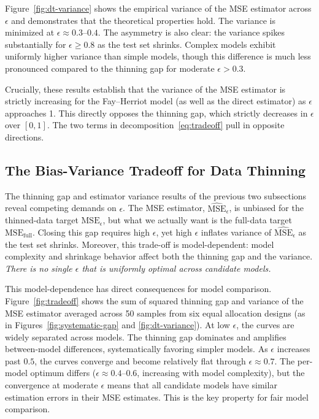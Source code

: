 \documentclass[11pt]{article}
\newcommand{\msehat}{\widehat{\mathrm{MSE}}_{\epsilon}}
\newcommand{\msethin}{\mathrm{MSE}_{\epsilon}}
\newcommand{\msefull}{\mathrm{MSE}_{\mathrm{full}}}
\theoremstyle{plain}
\theoremstyle{definition}
\theoremstyle{remark}
\begin{document}
Figure~\ref{fig:dt-variance} shows the empirical variance of the MSE estimator across $\epsilon$ and demonstrates that the theoretical properties hold. The variance is minimized at $\epsilon \approx 0.3$--$0.4$. The asymmetry is also clear: the variance spikes substantially for $\epsilon \geq 0.8$ as the test set shrinks. Complex models exhibit uniformly higher variance than simple models, though this difference is much less pronounced compared to the thinning gap for moderate $\epsilon>0.3$.

Crucially, these results establish that the variance of the MSE estimator is strictly increasing for the Fay--Herriot model (as well as the direct estimator) as $\epsilon$ approaches 1. This directly opposes the thinning gap, which strictly decreases in $\epsilon$ over $[0, 1]$.  The two terms in decomposition~\eqref{eq:tradeoff} pull in opposite directions.




\subsection{The Bias-Variance Tradeoff for Data Thinning}\label{sec:fundamental_tension}

The thinning gap and estimator variance results of the previous two subsections reveal competing demands on $\epsilon$. The MSE estimator, $\msehat$, is unbiased for the thinned-data target $\msethin$, but what we actually want is the full-data target $\msefull$. Closing this gap requires high $\epsilon$, yet high $\epsilon$ inflates variance of $\msehat$ as the test set shrinks. Moreover, this trade-off is model-dependent: model complexity and shrinkage behavior affect both the thinning gap and the variance. \textit{There is no single $\epsilon$ that is uniformly optimal across candidate models.}

This model-dependence has direct consequences for model comparison. Figure~\ref{fig:tradeoff} shows the sum of squared thinning gap and variance of the MSE estimator averaged across 50 samples from six equal allocation designs (as in Figures~\ref{fig:systematic-gap} and \ref{fig:dt-variance}). At low $\epsilon$, the curves are widely separated across models. The thinning gap dominates and amplifies between-model differences, systematically favoring simpler models. As $\epsilon$ increases past $0.5$, the curves converge and become relatively flat through $\epsilon \approx 0.7$. The per-model optimum differs ($\epsilon \approx 0.4$--$0.6$, increasing with model complexity), but the convergence at moderate $\epsilon$ means that all candidate models have similar estimation errors in their MSE estimates. This is the key property for fair model comparison.
\end{document}
